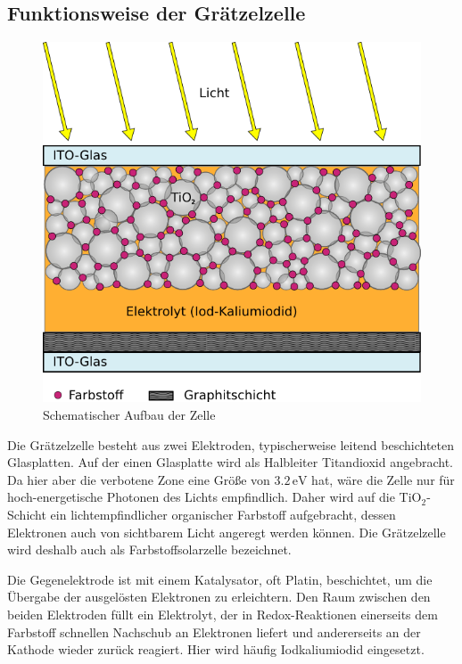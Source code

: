\documentclass[11pt]{scrartcl}
\newcommand{\unit}[1]{\ensuremath{\,\mathrm{#1}}} %
\begin{document}
\subsection{Funktionsweise der Gr\"atzelzelle}
\begin{figure}[ht]
\begin{center}
\includegraphics[height=0.4\textheight]{images/skizze.png}
\end{center}
\vspace{-1.5\baselineskip}
\caption{Schematischer Aufbau der Zelle}
\label{skizze}
\end{figure}
Die Gr\"atzelzelle besteht aus zwei Elektroden, typischerweise leitend beschichteten Glasplatten. Auf der einen Glasplatte wird als Halbleiter Titandioxid angebracht. Da hier aber die verbotene Zone eine Gr\"o\ss{}e von $3.2\unit{eV}$ hat, w\"are die Zelle nur f\"ur hoch-energetische Photonen des Lichts empfindlich. Daher wird auf die TiO$_{2}$-Schicht ein lichtempfindlicher organischer Farbstoff aufgebracht, dessen Elektronen auch von sichtbarem Licht angeregt werden k\"onnen. Die Gr\"atzelzelle wird deshalb auch als Farbstoffsolarzelle bezeichnet.

Die Gegenelektrode ist mit einem Katalysator, oft Platin, beschichtet, um die \"Ubergabe der ausgel\"osten Elektronen zu erleichtern. Den Raum zwischen den beiden Elektroden f\"ullt ein Elektrolyt, der in Redox-Reaktionen einerseits dem Farbstoff schnellen Nachschub an Elektronen liefert und andererseits an der Kathode wieder zur\"uck reagiert. Hier wird h\"aufig Iodkaliumiodid eingesetzt.
\end{document}
